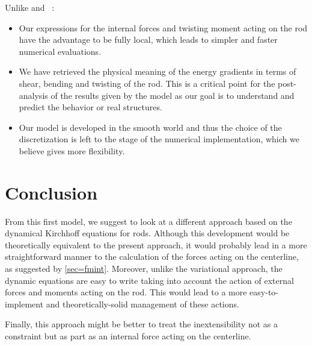 Unlike  and ~:
\begin{itemize}
\item Our expressions for the internal forces and twisting moment acting on the rod have the advantage to be fully local, which leads to simpler and faster numerical evaluations.
\item We have retrieved the physical meaning of the energy gradients in terms of shear, bending and twisting of the rod. This is a critical point for the post-analysis of the results given by the model as our goal is to understand and predict the behavior or real structures.
\item Our model is developed in the smooth world and thus the choice of the discretization is left to the stage of the numerical implementation, which we believe gives more flexibility.
\end{itemize}

\section{Conclusion}
From this first model, we suggest to look at a different approach based on the dynamical Kirchhoff equations for rods. Although this development would be theoretically equivalent to the present approach, it would probably lead in a more straightforward manner to the calculation of the forces acting on the centerline, as suggested by \cref{sec=fmint}. Moreover, unlike the variational approach, the dynamic equations are easy to write taking into account the action of external forces and moments acting on the rod. This would lead to a more easy-to-implement and theoretically-solid management of these actions.

Finally, this approach might be better to treat the inextensibility not as a constraint but as part as an internal force acting on the centerline.
